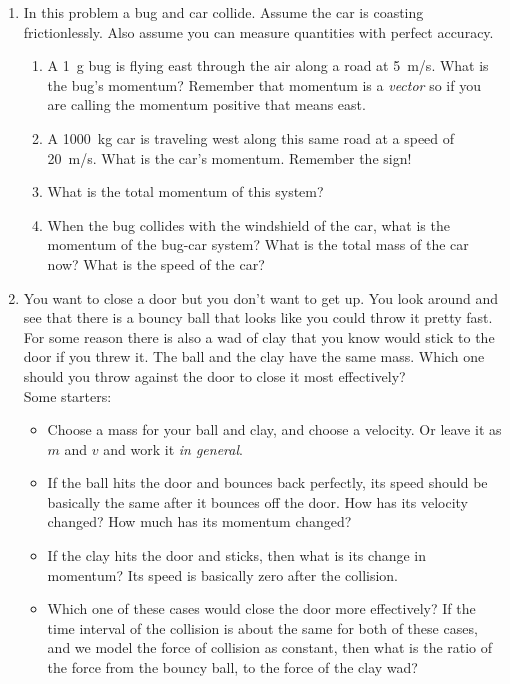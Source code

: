 \begin{enumerate}
\setlength\itemsep{1 in}

\item In this problem a bug and car collide. Assume the car is coasting frictionlessly. Also assume you can measure quantities with perfect accuracy. 
\begin{enumerate}
	\item A \SI{1}{\gram} bug is flying east through the air along a road at \SI{5}{m/s}. What is the bug's momentum? Remember that momentum is a \emph{vector} so if you are calling the momentum positive that means east.
	\item A \SI{1000}{kg} car is traveling west along this same road at a speed of \SI{20}{m/s}. What is the car's momentum. Remember the sign!
	\item What is the total momentum of this system?
	\item When the bug collides with the windshield of the car, what is the momentum of the bug-car system? What is the total mass of the car now? What is the speed of the car?
\end{enumerate}



\item You want to close a door but you don't want to get up. You look around and see that there is a bouncy ball that looks like you could throw it pretty fast. For some reason there is also a wad of clay that you know would stick to the door if you threw it. The ball and the clay have the same mass. Which one should you throw against the door to close it most effectively?\\
Some starters:
\begin{itemize}
	\item Choose a mass for your ball and clay, and choose a velocity. Or leave it as $m$ and $v$ and work it \emph{in general}.
	\item If the ball hits the door and bounces back perfectly, its speed should be basically the same after it bounces off the door. How has its velocity changed? How much has its momentum changed?\bigskip
	\item If the clay hits the door and sticks, then what is its change in momentum? Its speed is basically zero after the collision.\bigskip
	\item Which one of these cases would close the door more effectively? If the time interval of the collision is about the same for both of these cases, and we model the force of collision as constant, then what is the ratio of the force from the bouncy ball, to the force of the clay wad?
\end{itemize}



\end{enumerate}
